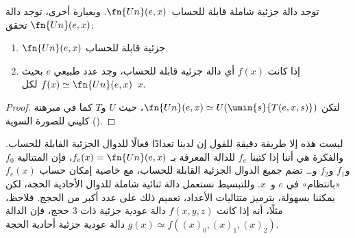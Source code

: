 \documentclass[../../../include/open-logic-section]{subfiles}
\begin{document}

\begin{thm}
توجد دالة جزئية شاملة قابلة للحساب~$\fn{Un}(e,x)$. وبعبارة أخرى، توجد
دالة $\fn{Un}(e,x)$ تحقق:
\begin{enumerate}
\item $\fn{Un}(e,x)$ جزئية قابلة للحساب.
\item إذا كانت $f(x)$ أي دالة جزئية قابلة للحساب، وجد عدد طبيعي $e$
بحيث $f(x)\simeq\fn{Un}(e,x)$ لكل~$x$.
\end{enumerate}
\end{thm}

\begin{proof}
لتكن $\fn{Un}(e,x)\simeq U(\umin{s}{T(e,x,s)})$، حيث $U$ و$T$ كما
في مبرهنة كليني للصورة السوية ().
\end{proof}

\begin{explain}
ليست هذه إلا طريقة دقيقة للقول إن لدينا تعدادًا فعالًا للدوال الجزئية
القابلة للحساب. والفكرة هي أننا إذا كتبنا $f_e$ للدالة المعرفة بـ
$f_e(x)=\fn{Un}(e,x)$، فإن المتتالية $f_0$ و$f_1$ و$f_2$ و… تضم
جميع الدوال الجزئية القابلة للحساب، مع خاصية إمكان حساب $f_e(x)$
«بانتظام» في $e$ و~$x$. وللتبسيط نستعمل دالة ثنائية شاملة للدوال
الأحادية الحجة، لكن يمكننا بسهولة، بترميز متتاليات الأعداد، تعميم ذلك
على عدد أكبر من الحجج. فلاحظ، مثلًا، أنه إذا كانت $f(x,y,z)$ دالة
عودية جزئية ذات $3$ حجج، فإن الدالة
$g(x)\simeq f((x)_0,(x)_1,(x)_2)$ دالة عودية جزئية أحادية الحجة.
\end{explain}
\end{document}
